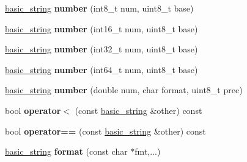 \begin{DoxyCompactItemize}
\item 
\hyperlink{classgxx_1_1basic__string}{basic\+\_\+string} {\bfseries number} (int8\+\_\+t num, uint8\+\_\+t base)\hypertarget{classgxx_1_1basic__string_ada56b279d6f1dbdd992a417ac831c03d}{}\label{classgxx_1_1basic__string_ada56b279d6f1dbdd992a417ac831c03d}

\item 
\hyperlink{classgxx_1_1basic__string}{basic\+\_\+string} {\bfseries number} (int16\+\_\+t num, uint8\+\_\+t base)\hypertarget{classgxx_1_1basic__string_acac1beca980510bc6539f2f19b291b11}{}\label{classgxx_1_1basic__string_acac1beca980510bc6539f2f19b291b11}

\item 
\hyperlink{classgxx_1_1basic__string}{basic\+\_\+string} {\bfseries number} (int32\+\_\+t num, uint8\+\_\+t base)\hypertarget{classgxx_1_1basic__string_a076226c8b332a808706a3ad07ef52c42}{}\label{classgxx_1_1basic__string_a076226c8b332a808706a3ad07ef52c42}

\item 
\hyperlink{classgxx_1_1basic__string}{basic\+\_\+string} {\bfseries number} (int64\+\_\+t num, uint8\+\_\+t base)\hypertarget{classgxx_1_1basic__string_a6946d9811d0a90cc9a10a3acab2f2d21}{}\label{classgxx_1_1basic__string_a6946d9811d0a90cc9a10a3acab2f2d21}

\item 
\hyperlink{classgxx_1_1basic__string}{basic\+\_\+string} {\bfseries number} (double num, char format, uint8\+\_\+t prec)\hypertarget{classgxx_1_1basic__string_a8d3cc51213ddc8fcf55b932071295bea}{}\label{classgxx_1_1basic__string_a8d3cc51213ddc8fcf55b932071295bea}

\item 
bool {\bfseries operator$<$} (const \hyperlink{classgxx_1_1basic__string}{basic\+\_\+string} \&other) const \hypertarget{classgxx_1_1basic__string_ab369029cf8bb103309e2bf074742b877}{}\label{classgxx_1_1basic__string_ab369029cf8bb103309e2bf074742b877}

\item 
bool {\bfseries operator==} (const \hyperlink{classgxx_1_1basic__string}{basic\+\_\+string} \&other) const \hypertarget{classgxx_1_1basic__string_ace0e2a9d7a63d658d8b3656e5ffe6f0a}{}\label{classgxx_1_1basic__string_ace0e2a9d7a63d658d8b3656e5ffe6f0a}

\item 
\hyperlink{classgxx_1_1basic__string}{basic\+\_\+string} {\bfseries format} (const char $\ast$fmt,...)\hypertarget{classgxx_1_1basic__string_a26961d8dcf90bf86e32ded0cc681516b}{}\label{classgxx_1_1basic__string_a26961d8dcf90bf86e32ded0cc681516b}


\end{DoxyCompactItemize}
